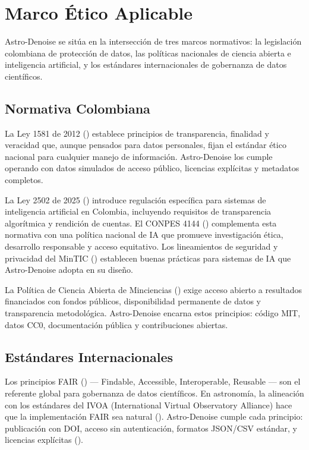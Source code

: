 \section{Marco Ético Aplicable}

Astro-Denoise se sitúa en la intersección de tres marcos normativos: la legislación colombiana de protección de datos, las políticas nacionales de ciencia abierta e inteligencia artificial, y los estándares internacionales de gobernanza de datos científicos.

\subsection{Normativa Colombiana}

La Ley 1581 de 2012 (\cite{colombia2012}) establece principios de transparencia, finalidad y veracidad que, aunque pensados para datos personales, fijan el estándar ético nacional para cualquier manejo de información. Astro-Denoise los cumple operando con datos simulados de acceso público, licencias explícitas y metadatos completos.

La Ley 2502 de 2025 (\cite{ley2502}) introduce regulación específica para sistemas de inteligencia artificial en Colombia, incluyendo requisitos de transparencia algorítmica y rendición de cuentas. El CONPES 4144 (\cite{conpes4144}) complementa esta normativa con una política nacional de IA que promueve investigación ética, desarrollo responsable y acceso equitativo. Los lineamientos de seguridad y privacidad del MinTIC (\cite{mintic2024}) establecen buenas prácticas para sistemas de IA que Astro-Denoise adopta en su diseño.

La Política de Ciencia Abierta de Minciencias (\cite{minciencias2022}) exige acceso abierto a resultados financiados con fondos públicos, disponibilidad permanente de datos y transparencia metodológica. Astro-Denoise encarna estos principios: código MIT, datos CC0, documentación pública y contribuciones abiertas.

\subsection{Estándares Internacionales}

Los principios FAIR (\cite{wilkinson2016}) — Findable, Accessible, Interoperable, Reusable — son el referente global para gobernanza de datos científicos. En astronomía, la alineación con los estándares del IVOA (International Virtual Observatory Alliance) hace que la implementación FAIR sea natural (\cite{otoole2022}). Astro-Denoise cumple cada principio: publicación con DOI, acceso sin autenticación, formatos JSON/CSV estándar, y licencias explícitas (\cite{schindler2024}).

